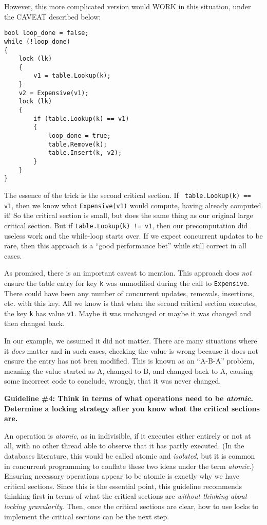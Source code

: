 \documentclass[10pt]{article}
\begin{document}
However, this more complicated version would WORK in this situation,
under the CAVEAT described below:
\begin{verbatim}
bool loop_done = false;
while (!loop_done)
{
    lock (lk)
    {
        v1 = table.Lookup(k);
    }
    v2 = Expensive(v1);
    lock (lk)
    {
        if (table.Lookup(k) == v1)
        {
            loop_done = true;
            table.Remove(k);
            table.Insert(k, v2);
        }
    }
}
\end{verbatim}
The essence of the trick is the second critical section.  If {\tt
  table.Lookup(k) == v1}, then we know what {\tt Expensive(v1)} would
  compute, having already computed it!  So the critical section is
  small, but does the same thing as our original large critical
  section.  But if {\tt table.Lookup(k) != v1}, then our precomputation
  did useless work and the while-loop starts over.  If we expect
  concurrent updates to be rare, then this approach is a ``good
  performance bet'' while still correct in all cases.
  
  As promised, there is an important caveat to mention.  This approach
  does \emph{not} ensure the table entry for key {\tt k} was
  unmodified during the call to {\tt Expensive}.  There could have
  been any number of concurrent updates, removals, insertions, etc.
  with this key.  All we know is that when the second critical section
  executes, the key {\tt k} has value {\tt v1}.  Maybe it was
  unchanged or maybe it was changed and then changed back.

In our example, we assumed it did not matter.  There are many
situations where it \emph{does} matter and in such cases, checking the
value is wrong because it does not ensure the entry has not been
modified.  This is known as an ``A-B-A'' problem, meaning the value
started as A, changed to B, and changed back to A, causing some
incorrect code to conclude, wrongly, that it was never changed.

\medskip
\noindent\textbf{Guideline \#4: Think in terms of what operations need
to be \emph{atomic}.  Determine a locking strategy after you know what
the critical sections are.}
\medskip

An operation is \emph{atomic}, as in indivisible, if it executes
either entirely or not at all, with no other thread able to observe
that it has partly executed.  (In the databases literature, this would
be called atomic and \emph{isolated}, but it is common in concurrent
programming to conflate these two ideas under the term \emph{atomic}.)
Ensuring necessary operations appear to be atomic is exactly why we
have critical sections.  Since this is the essential point, this
guideline recommends thinking first in terms of what the critical
sections are \emph{without thinking about locking granularity}.  Then,
once the critical sections are clear, how to use locks to implement
the critical sections can be the next step.
\end{document}
